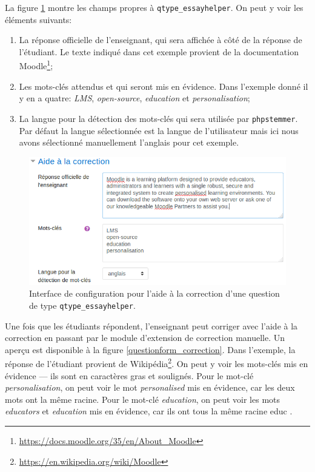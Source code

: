 La figure \ref{questionform_helper} montre les champs propres \`a \texttt{qtype\_essayhelper}.
On peut y voir les \'el\'ements suivants:
\begin{enumerate}
  \item La r\'eponse officielle de l'enseignant, qui sera affich\'ee \`a c\^ot\'e de la r\'eponse de l'\'etudiant. Le texte indiqu\'e dans cet exemple provient de la documentation Moodle\footnote{\url{https://docs.moodle.org/35/en/About_Moodle}};
  \item Les mots-cl\'es attendus et qui seront mis en \'evidence. Dans l'exemple donn\'e il y en a quatre: \textit{LMS}, \textit{open-source}, \textit{education} et \textit{personalisation};
  \item La langue pour la d\'etection des mots-cl\'es qui sera utilis\'ee par \texttt{phpstemmer}.
    Par d\'efaut la langue s\'electionn\'ee est la langue de l'utilisateur mais ici nous avons s\'electionn\'e manuellement l'anglais pour cet exemple.
\end{enumerate}
\begin{figure}[htbp]
  \includegraphics[scale=0.85]{images/questionform_helper.png}
  \caption{Interface de configuration pour l'aide \`a la correction d'une question de type \texttt{qtype\_essayhelper}.}
  \label{questionform_helper}
\end{figure}

Une fois que les \'etudiants r\'epondent, l'enseignant peut corriger avec l'aide \`a la correction en passant par le module d'extension de correction manuelle.
Un aperçu est disponible \`a la figure \ref{questionform_correction}.
Dans l'exemple, la r\'eponse de l'\'etudiant provient de Wikip\'edia\footnote{\url{https://en.wikipedia.org/wiki/Moodle}}.
On peut y voir les mots-cl\'es mis en \'evidence --- ils sont en caract\`eres gras et soulign\'es.
Pour le mot-cl\'e \textit{personalisation}, on peut voir le mot \textit{personalised} mis en \'evidence, car les deux mots ont la m\^eme racine.
Pour le mot-cl\'e \textit{education}, on peut voir les mots \textit{educators} et \textit{education} mis en \'evidence, car ils ont tous la m\^eme racine \og educ \fg{} .

